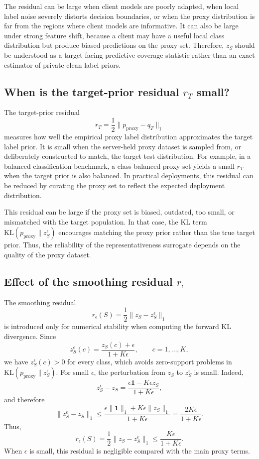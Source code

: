 \documentclass[conference]{IEEEtran}
\theoremstyle{definition}
\theoremstyle{remark}
\begin{document}
The residual can be large when client models are poorly adapted, when local label noise severely distorts decision boundaries, or when the proxy distribution is far from the regions where client models are informative.
It can also be large under strong feature shift, because a client may have a useful local class distribution but produce biased predictions on the proxy set.
Therefore, $z_S$ should be understood as a target-facing predictive coverage statistic rather than an exact estimator of private clean label priors.

\subsection{When is the target-prior residual $r_T$ small?}
\label{app:target_prior_residual}

The target-prior residual
\[
r_T
=
\frac12\|p_{\mathrm{proxy}}-q_T\|_1
\]
measures how well the empirical proxy label distribution approximates the target label prior.
It is small when the server-held proxy dataset is sampled from, or deliberately constructed to match, the target test distribution.
For example, in a balanced classification benchmark, a class-balanced proxy set yields a small $r_T$ when the target prior is also balanced.
In practical deployments, this residual can be reduced by curating the proxy set to reflect the expected deployment distribution.

This residual can be large if the proxy set is biased, outdated, too small, or mismatched with the target population.
In that case, the KL term $\mathrm{KL}(p_{\mathrm{proxy}}\|z_S^\epsilon)$ encourages matching the proxy prior rather than the true target prior.
Thus, the reliability of the representativeness surrogate depends on the quality of the proxy dataset.

\subsection{Effect of the smoothing residual $r_\epsilon$}
\label{app:smoothing_residual}

The smoothing residual
\[
r_\epsilon(S)
=
\frac12\|z_S-z_S^\epsilon\|_1
\]
is introduced only for numerical stability when computing the forward KL divergence.
Since
\[
z_S^\epsilon(c)
=
\frac{z_S(c)+\epsilon}{1+K\epsilon},
\qquad c=1,\dots,K,
\]
we have $z_S^\epsilon(c)>0$ for every class, which avoids zero-support problems in $\mathrm{KL}(p_{\mathrm{proxy}}\|z_S^\epsilon)$.
For small $\epsilon$, the perturbation from $z_S$ to $z_S^\epsilon$ is small.
Indeed,
\[
z_S^\epsilon-z_S
=
\frac{\epsilon\mathbf 1-K\epsilon z_S}{1+K\epsilon},
\]
and therefore
\[
\|z_S^\epsilon-z_S\|_1
\le
\frac{\epsilon\|\mathbf 1\|_1+K\epsilon\|z_S\|_1}{1+K\epsilon}
=
\frac{2K\epsilon}{1+K\epsilon}.
\]
Thus,
\[
r_\epsilon(S)
=
\frac12\|z_S-z_S^\epsilon\|_1
\le
\frac{K\epsilon}{1+K\epsilon}.
\]
When $\epsilon$ is small, this residual is negligible compared with the main proxy terms.
\end{document}
